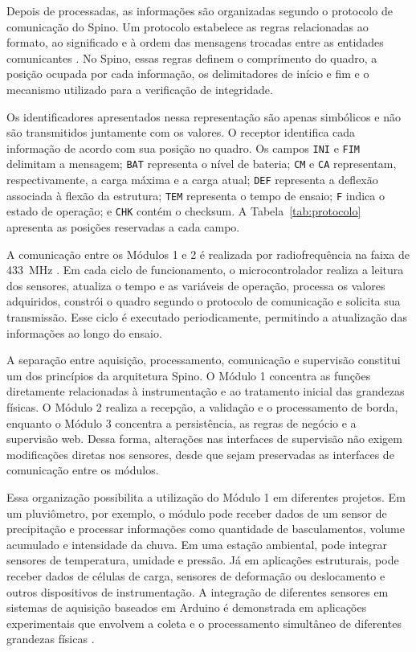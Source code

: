 \documentclass[conference]{IEEEtran}
\begin{document}
Depois de processadas, as informações são organizadas segundo o
protocolo de comunicação do Spino. Um protocolo estabelece as
regras relacionadas ao formato, ao significado e à ordem das
mensagens trocadas entre as entidades comunicantes
\cite{tanenbaum2011}. No Spino, essas regras definem o
comprimento do quadro, a posição ocupada por cada informação,
os delimitadores de início e fim e o mecanismo utilizado para a
verificação de integridade.


Os identificadores apresentados nessa representação são apenas
simbólicos e não são transmitidos juntamente com os valores. O
receptor identifica cada informação de acordo com sua posição no
quadro. Os campos \texttt{INI} e \texttt{FIM} delimitam a
mensagem; \texttt{BAT} representa o nível de bateria;
\texttt{CM} e \texttt{CA} representam, respectivamente, a carga
máxima e a carga atual; \texttt{DEF} representa a deflexão
associada à flexão da estrutura; \texttt{TEM} representa o tempo
de ensaio; \texttt{F} indica o estado de operação; e
\texttt{CHK} contém o checksum. A
Tabela~\ref{tab:protocolo} apresenta as posições reservadas a cada
campo.

A comunicação entre os Módulos 1 e 2 é realizada por
radiofrequência na faixa de 433~MHz \cite{ouldzira2019}. Em
cada ciclo de funcionamento, o microcontrolador realiza a
leitura dos sensores, atualiza o tempo e as variáveis de
operação, processa os valores adquiridos, constrói o quadro
segundo o protocolo de comunicação e solicita sua transmissão.
Esse ciclo é executado periodicamente, permitindo a atualização
das informações ao longo do ensaio.

A separação entre aquisição, processamento, comunicação e
supervisão constitui um dos princípios da arquitetura Spino. O
Módulo 1 concentra as funções diretamente relacionadas à
instrumentação e ao tratamento inicial das grandezas físicas. O
Módulo 2 realiza a recepção, a validação e o processamento de
borda, enquanto o Módulo 3 concentra a persistência, as regras
de negócio e a supervisão web. Dessa forma, alterações nas
interfaces de supervisão não exigem modificações diretas nos
sensores, desde que sejam preservadas as interfaces de
comunicação entre os módulos.

Essa organização possibilita a utilização do Módulo 1 em
diferentes projetos. Em um pluviômetro, por exemplo, o módulo
pode receber dados de um sensor de precipitação e processar
informações como quantidade de basculamentos, volume acumulado
e intensidade da chuva. Em uma estação ambiental, pode integrar
sensores de temperatura, umidade e pressão. Já em aplicações
estruturais, pode receber dados de células de carga, sensores de
deformação ou deslocamento e outros dispositivos de
instrumentação. A integração de diferentes sensores em sistemas
de aquisição baseados em Arduino é demonstrada em aplicações
experimentais que envolvem a coleta e o processamento simultâneo
de diferentes grandezas físicas
\cite{vidalpardo2018,njoku2025}.
\end{document}
